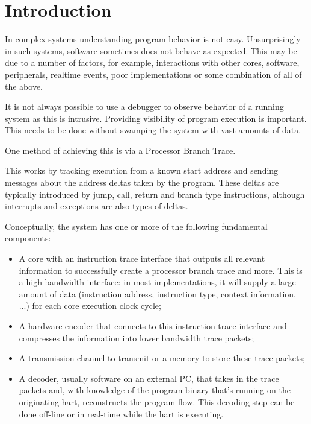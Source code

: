 \chapter{Introduction}
\label{sec:intro}

In complex systems understanding program behavior is not easy.
Unsurprisingly in such systems, software sometimes does not behave as
expected. This may be due to a number of factors, for example,
interactions with other cores, software, peripherals, realtime
events, poor implementations or some combination of all of the above.

It is not always possible to use a debugger to observe behavior of a
running system as this is intrusive.  Providing visibility of program
execution is important.  This needs to be done without swamping the
system with vast amounts of data.

One method of achieving this is via a Processor Branch Trace.

This works by tracking execution from a known start address and sending
messages about the address deltas taken by the program. These deltas are
typically introduced by jump, call, return and branch type instructions,
although interrupts and exceptions are also types of deltas.

Conceptually, the system has one or more of the following fundamental components:

\begin{itemize}
  \item
    A core with an instruction trace interface that outputs all relevant
    information to successfully create a processor branch trace and more.
    This is a high bandwidth interface: in most implementations, it will supply
    a large amount of data (instruction address, instruction type, context information, ...)
    for each core execution clock cycle;
  \item
    A hardware encoder that connects to this instruction trace interface and compresses
    the information into lower bandwidth trace packets;
  \item
    A transmission channel to transmit or a memory to store these trace packets;
  \item
    A decoder, usually software on an external PC, that takes in the trace
    packets and, with knowledge of the program binary that's running on the
    originating hart, reconstructs the program flow. This decoding step can
    be done off-line or in real-time while the hart is executing.
\end{itemize}

